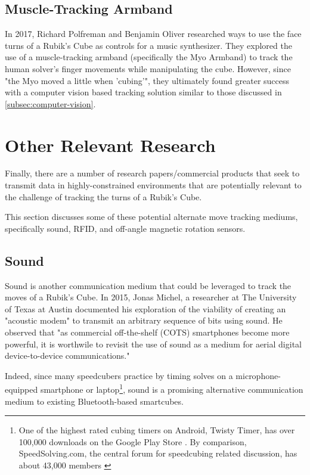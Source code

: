 \subsection{Muscle-Tracking Armband}
In 2017, Richard Polfreman and Benjamin Oliver researched ways to use the face turns of a Rubik's Cube as controls for a music synthesizer. They explored the use of a muscle-tracking armband (specifically the Myo Armband) to track the human solver's finger movements while manipulating the cube. However, since "the Myo moved a little when 'cubing'", they ultimately found greater success with a computer vision based tracking solution similar to those discussed in \ref{subsec:computer-vision}.


\section{Other Relevant Research}
\label{sec:other-research}
Finally, there are a number of research papers/commercial products that seek to transmit data in highly-constrained environments that are potentially relevant to the challenge of tracking the turns of a Rubik's Cube.

This section discusses some of these potential alternate move tracking mediums, specifically sound, RFID, and off-angle magnetic rotation sensors.

\subsection{Sound}
\label{subsec:sound}
Sound is another communication medium that could be leveraged to track the moves of a Rubik's Cube. In 2015, Jonas Michel, a researcher at The University of Texas at Austin documented his exploration of the viability of creating an "acoustic modem" to transmit an arbitrary sequence of bits using sound.
He observed that "as commercial off-the-shelf (COTS) smartphones become more powerful, it is worthwile to revisit the use of sound as a medium for aerial digital device-to-device communications." \cite{michel-sound}

Indeed, since many speedcubers practice by timing solves on a microphone-equipped smartphone or laptop\footnote{One of the highest rated cubing timers on Android, Twisty Timer, has over 100,000 downloads on the Google Play Store \cite{googleplay-twistytimer}. By comparison, SpeedSolving.com, the central forum for speedcubing related discussion, has about 43,000 members \cite{speedsolving-com}}, sound is a promising alternative communication medium to existing Bluetooth-based smartcubes.

